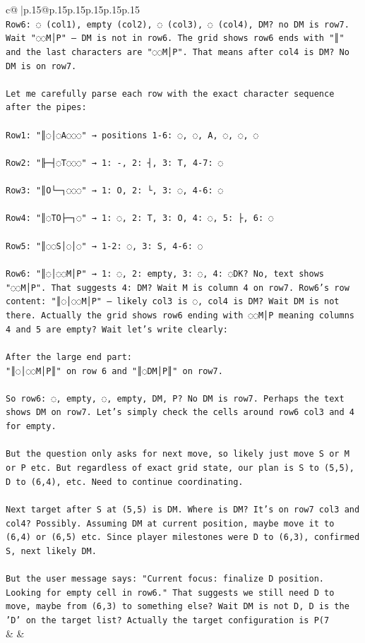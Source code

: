 \documentclass{article}
\begin{document}
{\begin{supertabular}{c@{$\;$}|p{.15\linewidth}@{}p{.15\linewidth}p{.15\linewidth}p{.15\linewidth}p{.15\linewidth}p{.15\linewidth}}
{{{\\ 
\texttt{Row6: ◌ (col1), empty (col2), ◌ (col3), ◌ (col4), DM? no DM is row7. Wait "◌◌M│P" — DM is not in row6. The grid shows row6 ends with "║" and the last characters are "◌◌M│P". That means after col4 is DM? No DM is on row7.} \\
\\ 
\texttt{Let me carefully parse each row with the exact character sequence after the pipes:} \\
\\ 
\texttt{Row1: "║◌│◌A◌◌◌" → positions 1{-}6: ◌, ◌, A, ◌, ◌, ◌} \\
\\ 
\texttt{Row2: "╟─┤◌T◌◌◌" → 1: {-}, 2: ┤, 3: T, 4{-}7: ◌} \\
\\ 
\texttt{Row3: "║O└─┐◌◌◌" → 1: O, 2: └, 3: ◌, 4{-}6: ◌} \\
\\ 
\texttt{Row4: "║◌TO├─┐◌" → 1: ◌, 2: T, 3: O, 4: ◌, 5: ├, 6: ◌} \\
\\ 
\texttt{Row5: "║◌◌S│◌│◌" → 1{-}2: ◌, 3: S, 4{-}6: ◌} \\
\\ 
\texttt{Row6: "║◌│◌◌M│P" → 1: ◌, 2: empty, 3: ◌, 4: ◌DK? No, text shows "◌◌M│P". That suggests 4: DM? Wait M is column 4 on row7. Row6's row content: "║◌│◌◌M│P" — likely col3 is ◌, col4 is DM? Wait DM is not there. Actually the grid shows row6 ending with ◌◌M│P meaning columns 4 and 5 are empty? Wait let's write clearly:} \\
\\ 
\texttt{After the large end part: } \\
\texttt{"║◌│◌◌M│P║" on row 6 and "║◌DM│P║" on row7.} \\
\\ 
\texttt{So row6: ◌, empty, ◌, empty, DM, P? No DM is row7. Perhaps the text shows DM on row7. Let's simply check the cells around row6 col3 and 4 for empty. } \\
\\ 
\texttt{But the question only asks for next move, so likely just move S or M or P etc. But regardless of exact grid state, our plan is S to (5,5), D to (6,4), etc. Need to continue coordinating.} \\
\\ 
\texttt{Next target after S at (5,5) is DM. Where is DM? It's on row7 col3 and col4? Possibly. Assuming DM at current position, maybe move it to (6,4) or (6,5) etc. Since player milestones were D to (6,3), confirmed S, next likely DM. } \\
\\ 
\texttt{But the user message says: "Current focus: finalize D position. Looking for empty cell in row6." That suggests we still need D to move, maybe from (6,3) to something else? Wait DM is not D, D is the 'D' on the target list? Actually the target configuration is P(7} \\
            }
        }
    }
    & & \\ \\


\end{supertabular}}
\end{document}
